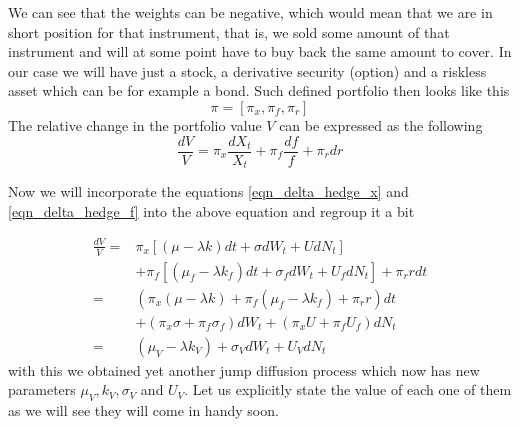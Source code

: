 \documentclass[times, utf8, diplomski]{fer}
\begin{document}
We can see that the weights can be negative, which would mean that we are in short position for that instrument, that is, we sold some amount of that instrument and will at some point have to buy back the same amount to cover. In our case we will have just a stock, a derivative security (option) and a riskless asset which can be for example a bond. Such defined portfolio then looks like this 
$$ \pi = [\pi_x, \pi_f, \pi_r] $$
The relative change in the portfolio value $V$ can be expressed as the following
\begin{equation}\label{eqn_delta_hedge_v}
	\frac{dV}{V} = \pi_x\frac{dX_t}{X_t} + \pi_f\frac{df}{f} + \pi_r dr
\end{equation}

Now we will incorporate the equations \ref{eqn_delta_hedge_x} and \ref{eqn_delta_hedge_f} into the above equation and regroup it a bit

\begin{align*}
	\frac{dV}{V} =& \pi_x [(\mu - \lambda k)dt + \sigma dW_t + UdN_t] \\&+\pi_f [(\mu_f - \lambda k_f)dt + \sigma_f dW_t + U_fdN_t] +\pi_r r dt \\
				 =& (\pi_x(\mu-\lambda k) + \pi_f (\mu_f - \lambda k_f) + \pi_r r) dt \\&+ (\pi_x\sigma + \pi_f\sigma_f)dW_t + (\pi_x U + \pi_f U_f)dN_t \\
				 =& (\mu_V - \lambda k_V) + \sigma_V dW_t + U_V dN_t
\end{align*} with this we obtained yet another jump diffusion process which now has new parameters $\mu_V, k_V, \sigma_V$ and $U_V$. Let us explicitly state the value of each one of them as we will see they will come in handy soon.
\end{document}
